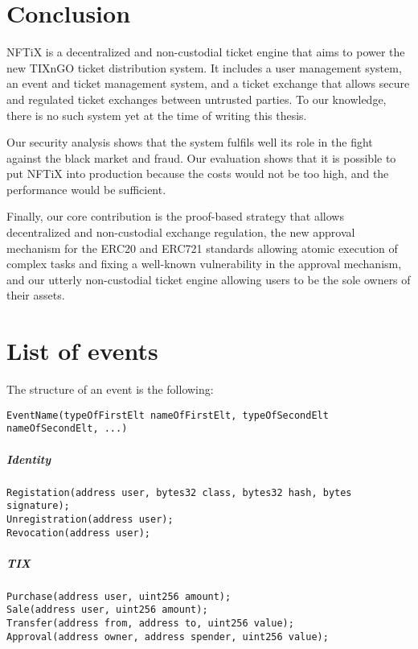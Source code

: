 \documentclass[a4paper,11pt,oneside]{report}
\begin{document}
\chapter{Conclusion}
NFTiX is a decentralized and non-custodial ticket engine that aims to power the new TIXnGO ticket distribution system. It includes a user management system, an event and ticket management system, and a ticket exchange that allows secure and regulated ticket exchanges between untrusted parties. To our knowledge, there is no such system yet at the time of writing this thesis.

Our security analysis shows that the system fulfils well its role in the fight against the black market and fraud. Our evaluation shows that it is possible to put NFTiX into production because the costs would not be too high, and the performance would be sufficient.

Finally, our core contribution is the proof-based strategy that allows decentralized and non-custodial exchange regulation, the new approval mechanism for the ERC20 and ERC721 standards allowing atomic execution of complex tasks and fixing a well-known vulnerability in the approval mechanism, and our utterly non-custodial ticket engine allowing users to be the sole owners of their assets.

\cleardoublepage
{}
{}
\nocite{*}
\printbibliography

\appendix
\chapter{List of events}
\label{sec:appendix_a}

The structure of an event is the following: 
\begin{verbatim}
EventName(typeOfFirstElt nameOfFirstElt, typeOfSecondElt nameOfSecondElt, ...)
\end{verbatim}

\paragraph{Identity}
\begin{verbatim}
Registation(address user, bytes32 class, bytes32 hash, bytes signature);
Unregistration(address user);
Revocation(address user);
\end{verbatim}

\paragraph{TIX}
\begin{verbatim}
Purchase(address user, uint256 amount);
Sale(address user, uint256 amount);
Transfer(address from, address to, uint256 value);
Approval(address owner, address spender, uint256 value);
\end{verbatim}
\end{document}
